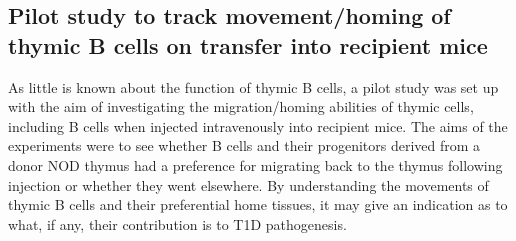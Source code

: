 \subsection{Pilot study to track movement/homing of thymic B cells on transfer into recipient mice}


As little is known about the function of thymic B cells, a pilot study was set up with the aim of investigating the migration/homing abilities of thymic cells, including B cells when injected intravenously into recipient mice.
The aims of the experiments were to see whether B cells and their progenitors derived from a donor NOD thymus had a preference for migrating back to the thymus following injection or whether they went elsewhere.
By understanding the movements of thymic B cells and their preferential home tissues, it may give an indication as to what, if any, their contribution is to T1D pathogenesis.


